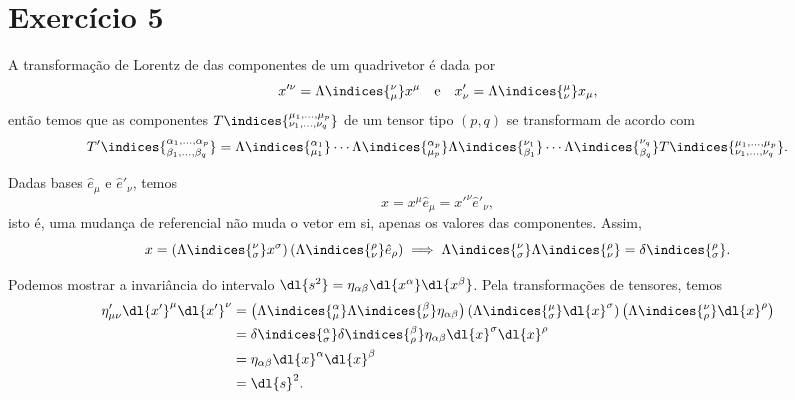 \section*{Exercício 5}
A transformação de Lorentz de das componentes de um quadrivetor é dada por
\begin{equation*}
    x'^{\nu} = \Lambda\indices{^{\nu}_\mu} x^\mu\quad\text{e}\quad x'_{\nu} = \Lambda\indices{_{\nu}^{\mu}}x_{\mu},
\end{equation*}
então temos que as componentes \(T\indices{^{\mu_1,\dots,\mu_p}_{\nu_1,\dots,\nu_q}}\) de um tensor tipo \((p,q)\) se transformam de acordo com
\begin{equation*}
    {T'}\indices{^{\alpha_1,\dots,\alpha_p}_{\beta_1,\dots,\beta_q}} = \Lambda\indices{^{\alpha_1}_{\mu_1}}\dotsm\Lambda\indices{^{\alpha_p}_{\mu_p}} \Lambda\indices{^{\nu_1}_{\beta_1}}\dotsm\Lambda\indices{^{\nu_q}_{\beta_q}} T\indices{^{\mu_1,\dots,\mu_p}_{\nu_1,\dots,\nu_q}}.
\end{equation*}

Dadas bases \(\hat{e}_{\mu}\) e \(\hat{e}'_\nu\), temos
\begin{equation*}
    x = x^\mu \hat{e}_{\mu} = x'^{\nu} \hat{e}'_{\nu},
\end{equation*}
isto é, uma mudança de referencial não muda o vetor em si, apenas os valores das componentes. Assim,
\begin{equation*}
    x = \left(\Lambda\indices{^\nu_\sigma}x^\sigma\right)\left(\Lambda\indices{_\nu^\rho} \hat{e}_{\rho}\right) \implies \Lambda\indices{^\nu_\sigma}\Lambda\indices{_\nu^\rho} = \delta\indices{^\rho_\sigma}.
\end{equation*}

Podemos mostrar a invariância do intervalo \(\dl{s^2} = \eta_{\alpha \beta}\dl{x^{\alpha}}\dl{x^{\beta}}\). Pela transformações de tensores, temos
\begin{align*}
    \eta'_{\mu\nu} \dl{x'}^\mu \dl{x'}^\nu &= \left(\Lambda\indices{_\mu^\alpha}\Lambda\indices{_\nu^\beta}\eta_{\alpha \beta}\right)\left(\Lambda\indices{^\mu_\sigma}\dl{x}^\sigma\right)\left(\Lambda\indices{^\nu_\rho}\dl{x}^\rho\right)\\
                                           &= \delta\indices{^\alpha_\sigma}\delta\indices{^\beta_\rho} \eta_{\alpha \beta} \dl{x}^\sigma \dl{x}^\rho\\
                                           &= \eta_{\alpha \beta} \dl{x}^\alpha \dl{x}^\beta\\
                                           &= \dl{s}^2.
\end{align*}

